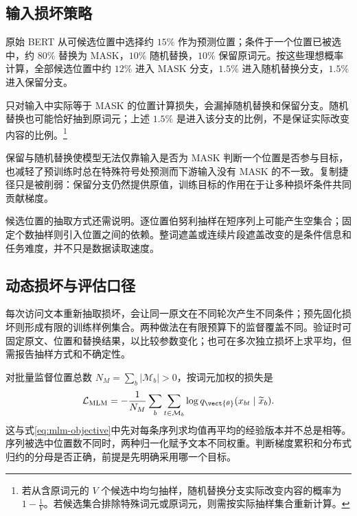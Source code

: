 \documentclass[../textbook.tex]{subfiles}
\begin{document}
\subsection{输入损坏策略}
原始 BERT 从可候选位置中选择约 $15\%$ 作为预测位置；条件于一个位置已被选中，约 $80\%$ 替换为 MASK，$10\%$ 随机替换，$10\%$ 保留原词元\cite{devlinBERTPretrainingDeep2019}。按这些理想概率计算，全部候选位置中约 $12\%$ 进入 MASK 分支，$1.5\%$ 进入随机替换分支，$1.5\%$ 进入保留分支。

只对输入中实际等于 MASK 的位置计算损失，会漏掉随机替换和保留分支。随机替换也可能恰好抽到原词元；上述 $1.5\%$ 是进入该分支的比例，不是保证实际改变内容的比例。\footnote{若从含原词元的 $V$ 个候选中均匀抽样，随机替换分支实际改变内容的概率为 $1-\frac{1}{V}$。若候选集合排除特殊词元或原词元，则需按实际抽样集合重新计算。}

保留与随机替换使模型无法仅靠输入是否为 MASK 判断一个位置是否参与目标，也减轻了预训练时总在特殊符号处预测而下游输入没有 MASK 的不一致。复制捷径只是被削弱：保留分支仍然提供原值，训练目标的作用在于让多种损坏条件共同贡献梯度。

候选位置的抽取方式还需说明。逐位置伯努利抽样在短序列上可能产生空集合；固定个数抽样则引入位置之间的依赖。整词遮盖或连续片段遮盖改变的是条件信息和任务难度，并不只是数据读取速度。

\subsection{动态损坏与评估口径}
每次访问文本重新抽取损坏，会让同一原文在不同轮次产生不同条件；预先固化损坏则形成有限的训练样例集合。两种做法在有限预算下的监督覆盖不同。验证时可固定原文、位置和替换结果，以比较参数变化；也可在多次独立损坏上求平均，但需报告抽样方式和不确定性。

对批量监督位置总数 $N_M=\sum_b|\mathcal M_b|>0$，按词元加权的损失是
\begin{equation}\label{eq:mlm-batchloss}
 \mathcal L_{\mathrm{MLM}}=-\frac1{N_M}\sum_b\sum_{t\in\mathcal M_b}
 \log q_{\vect{\theta}}(x_{bt}\mid\widetilde x_b).
\end{equation}
这与式\eqref{eq:mlm-objective}中先对每条序列求均值再平均的经验版本并不总是相等。序列被选中位置数不同时，两种归一化赋予文本不同权重。判断梯度累积和分布式归约的分母是否正确，前提是先明确采用哪一个目标。
\end{document}
